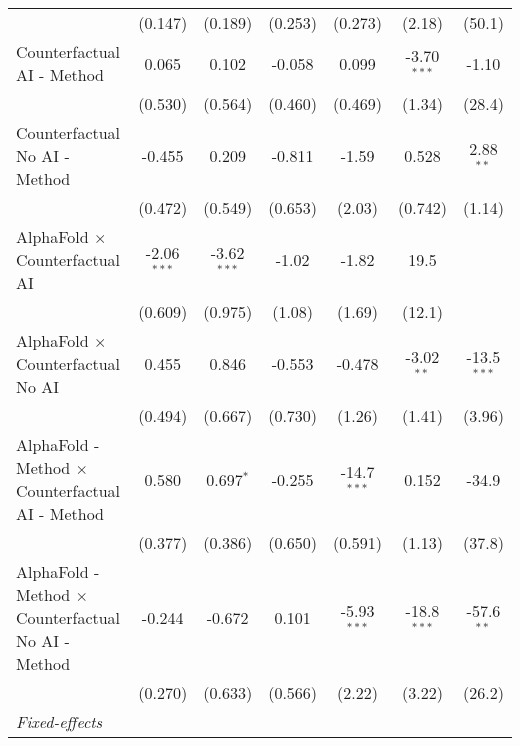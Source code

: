 \begin{tabular}{lcccccc}
                                                              & (0.147)       & (0.189)       & (0.253)      & (0.273)       & (2.18)        & (50.1)\\   
   Counterfactual AI - Method                                 & 0.065         & 0.102         & -0.058       & 0.099         & -3.70$^{***}$ & -1.10\\   
                                                              & (0.530)       & (0.564)       & (0.460)      & (0.469)       & (1.34)        & (28.4)\\   
   Counterfactual No AI - Method                              & -0.455        & 0.209         & -0.811       & -1.59         & 0.528         & 2.88$^{**}$\\   
                                                              & (0.472)       & (0.549)       & (0.653)      & (2.03)        & (0.742)       & (1.14)\\   
   AlphaFold $\times$ Counterfactual AI                       & -2.06$^{***}$ & -3.62$^{***}$ & -1.02        & -1.82         & 19.5          &   \\   
                                                              & (0.609)       & (0.975)       & (1.08)       & (1.69)        & (12.1)        &   \\   
   AlphaFold $\times$ Counterfactual No AI                    & 0.455         & 0.846         & -0.553       & -0.478        & -3.02$^{**}$  & -13.5$^{***}$\\   
                                                              & (0.494)       & (0.667)       & (0.730)      & (1.26)        & (1.41)        & (3.96)\\   
   AlphaFold - Method $\times$ Counterfactual AI - Method     & 0.580         & 0.697$^{*}$   & -0.255       & -14.7$^{***}$ & 0.152         & -34.9\\   
                                                              & (0.377)       & (0.386)       & (0.650)      & (0.591)       & (1.13)        & (37.8)\\   
   AlphaFold - Method $\times$ Counterfactual No AI - Method  & -0.244        & -0.672        & 0.101        & -5.93$^{***}$ & -18.8$^{***}$ & -57.6$^{**}$\\   
                                                              & (0.270)       & (0.633)       & (0.566)      & (2.22)        & (3.22)        & (26.2)\\   
   \midrule
   \emph{Fixed-effects}\\

\end{tabular}
